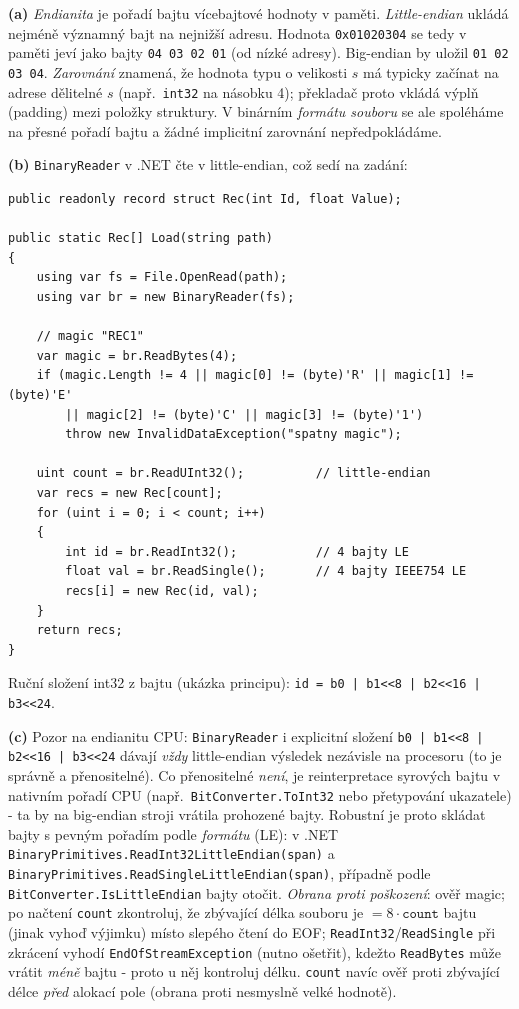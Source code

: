 \begin{reseni}
\textbf{(a)} \emph{Endianita} je pořadí bajtu vícebajtové hodnoty v paměti. \emph{Little-endian} ukládá nejméně významný bajt na nejnižší adresu. Hodnota \texttt{0x01020304} se tedy v paměti jeví jako bajty \texttt{04 03 02 01} (od nízké adresy). Big-endian by uložil \texttt{01 02 03 04}. \emph{Zarovnání} znamená, že hodnota typu o velikosti $s$ má typicky začínat na adrese dělitelné $s$ (např.\ \texttt{int32} na násobku 4); překladač proto vkládá výplň (padding) mezi položky struktury. V binárním \emph{formátu souboru} se ale spoléháme na přesné pořadí bajtu a žádné implicitní zarovnání nepředpokládáme.

\textbf{(b)} \texttt{BinaryReader} v .NET čte v little-endian, což sedí na zadání:
\begin{lstlisting}
public readonly record struct Rec(int Id, float Value);

public static Rec[] Load(string path)
{
    using var fs = File.OpenRead(path);
    using var br = new BinaryReader(fs);

    // magic "REC1"
    var magic = br.ReadBytes(4);
    if (magic.Length != 4 || magic[0] != (byte)'R' || magic[1] != (byte)'E'
        || magic[2] != (byte)'C' || magic[3] != (byte)'1')
        throw new InvalidDataException("spatny magic");

    uint count = br.ReadUInt32();          // little-endian
    var recs = new Rec[count];
    for (uint i = 0; i < count; i++)
    {
        int id = br.ReadInt32();           // 4 bajty LE
        float val = br.ReadSingle();       // 4 bajty IEEE754 LE
        recs[i] = new Rec(id, val);
    }
    return recs;
}
\end{lstlisting}
Ruční složení int32 z bajtu (ukázka principu): \texttt{id = b0 | b1<<8 | b2<<16 | b3<<24}.

\textbf{(c)} Pozor na endianitu CPU: \texttt{BinaryReader} i explicitní složení \texttt{b0 | b1<<8 | b2<<16 | b3<<24} dávají \emph{vždy} little-endian výsledek nezávisle na procesoru (to je správně a přenositelné). Co přenositelné \emph{není}, je reinterpretace syrových bajtu v nativním pořadí CPU (např.\ \texttt{BitConverter.ToInt32} nebo přetypování ukazatele) - ta by na big-endian stroji vrátila prohozené bajty. Robustní je proto skládat bajty s pevným pořadím podle \emph{formátu} (LE): v .NET \texttt{BinaryPrimitives.ReadInt32LittleEndian(span)} a \texttt{BinaryPrimitives.ReadSingleLittleEndian(span)}, případně podle \texttt{BitConverter.IsLittleEndian} bajty otočit. \emph{Obrana proti poškození}: ověř magic; po načtení \texttt{count} zkontroluj, že zbývající délka souboru je $=8\cdot\texttt{count}$ bajtu (jinak vyhoď výjimku) místo slepého čtení do EOF; \texttt{ReadInt32}/\texttt{ReadSingle} při zkrácení vyhodí \texttt{EndOfStreamException} (nutno ošetřit), kdežto \texttt{ReadBytes} může vrátit \emph{méně} bajtu - proto u něj kontroluj délku. \texttt{count} navíc ověř proti zbývající délce \emph{před} alokací pole (obrana proti nesmyslně velké hodnotě).
\end{reseni}

